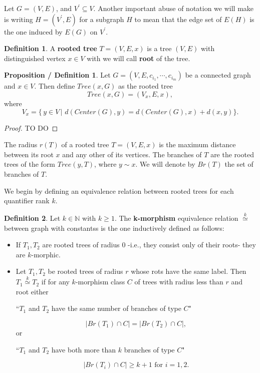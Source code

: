 \documentclass[11pt,notitlepage]{report}
\theoremstyle{definition}
\newtheorem{definition}{Definition}[chapter]
\newtheorem{propdef}{Proposition / Definition}[chapter]
\theoremstyle{remark}
\newcommand{\N}{\mathbb{N}}
\newcommand{\clist}{c_{i_1}, \cdots, c_{i_m}}
\newcommand{\morph}[1]{\stackrel{#1}{\simeq}}
\begin{document}
Let $G=(V,E)$, and $V^\prime\subseteq V$. Another important abuse 
of notation we will make is writing $H=(V^\prime, E)$ 
for a subgraph $H$ to mean that the edge set of $E(H)$ is the one
induced by $E(G)$ on $V^\prime$.

\begin{definition} 
	A \textbf{rooted tree} $T=(V,E,x)$ is a tree 
	$(V,E)$ with distinguished vertex $x\in V$ with we will call 
	\textbf{root} of the tree.
\end{definition}

\begin{propdef}
	Let $G=(V,E,\clist)$ be a connected graph and $x\in V$. 
	Then define $Tree(x,G)$	as the rooted tree
	\[Tree(x,G) = (V_x,E,x),\] where
	\[V_x= \{\, y\in V \, | \,\,d(Center(G),y) = d(Center(G),x) + d(x,y) \}.\]

\end{propdef}
\begin{proof}
	TO DO
\end{proof}



The radius $r(T)$ of a rooted tree $T=(V,E,x)$
is the maximum distance between its root $x$ and any other of
its vertices. The branches of $T$ are the rooted trees of the form
$Tree(y,T)$, where $y\sim x$. We will denote by $Br(T)$ the set of
branches of $T$. \par

We begin by defining an equivalence relation between rooted 
trees for each quantifier rank $k$.

\begin{definition} 
	Let $k\in \N$ with $k\geq 1$. The \textbf{k-morphism} equivalence relation
	$\morph{k}$ between
	graph with constantss is the one inductively defined as follows:
	\begin{itemize}
		\item If $T_1, T_2$ are rooted trees of radius $0$ -i.e., they
		consist only of their roots- they are $k$-morphic. 
		\item Let $T_1, T_2$ be rooted trees of radius $r$ whose 
		rots have the same label. Then $T_1 \morph{k} T_2$ if 
		for any $k$-morphism class $C$ of trees with
		radius less than $r$ and root either
		\begin{center}
			\vspace{-0.2cm}
			``$T_1$ and $T_2$ have the same number of branches of type $C$"
		\end{center}
		\vspace{-0.3cm}
		\[ |Br(T_1)\cap C| = |Br(T_2)\cap C|,\]
		or 
		\begin{center}
			\vspace{-0.2cm}
			``$T_1$ and $T_2$ have both more than $k$ branches of type $C$"
		\end{center}
	\vspace{-0.3cm}
		\[ |Br(T_i)\cap C| \geq k+1 \text{ for } i=1,2. \]
	\end{itemize} 
\end{definition}
\end{document}
